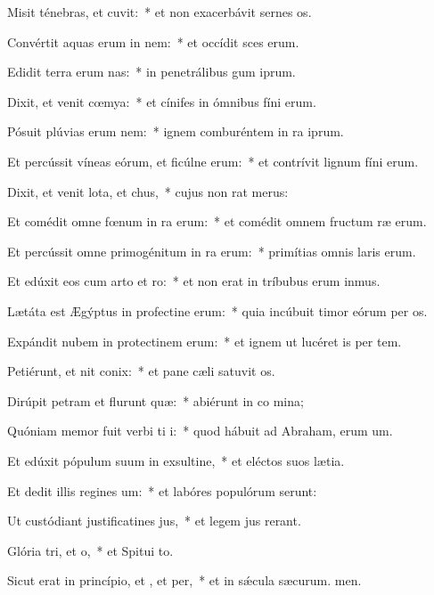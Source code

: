 \item Misit ténebras, et cuvit:~* et non exacerbávit sernes os.
\item Convértit aquas erum in nem:~* et occídit sces erum.
\item Edidit terra erum nas:~* in penetrálibus gum iprum.
\item Dixit, et venit cœmya:~* et cínifes in ómnibus fíni erum.
\item Pósuit plúvias erum nem:~* ignem comburéntem in ra iprum.
\item Et percússit víneas eórum, et ficúlne erum:~* et contrívit lignum fíni erum.
\item Dixit, et venit lota, et chus,~* cujus non rat merus:
\item Et comédit omne fœnum in ra erum:~* et comédit omnem fructum ræ erum.
\item Et percússit omne primogénitum in ra erum:~* primítias omnis laris erum.
\item Et edúxit eos cum arto et ro:~* et non erat in tríbubus erum inmus.
\item Lætáta est Ægýptus in profectine erum:~* quia incúbuit timor eórum per os.
\item Expándit nubem in protectinem erum:~* et ignem ut lucéret is per tem.
\item Petiérunt, et nit conix:~* et pane cæli satuvit os.
\item Dirúpit petram et flurunt quæ:~* abiérunt in co mina;
\item Quóniam memor fuit verbi ti i:~* quod hábuit ad Abraham, erum um.
\item Et edúxit pópulum suum in exsultine,~* et eléctos suos  lætia.
\item Et dedit illis regines um:~* et labóres populórum serunt:
\item Ut custódiant justificatines jus,~* et legem jus rerant.
\item Glória tri, et o,~* et Spitui to.
\item Sicut erat in princípio, et , et per,~* et in sǽcula sæcurum. men.
